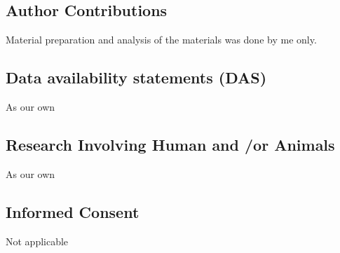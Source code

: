 \documentclass[sn-mathphys-num]{sn-jnl}
\theoremstyle{thmstyleone}
\theoremstyle{thmstyletwo}%
\theoremstyle{thmstylethree}%
\begin{document}
\subsection*{Author Contributions}
Material preparation and analysis of the materials was done by me only.

\subsection*{Data availability statements (DAS)}
As our own

\subsection*{Research Involving Human and /or Animals}
As our own

\subsection*{Informed Consent}
Not applicable



\end{document}
